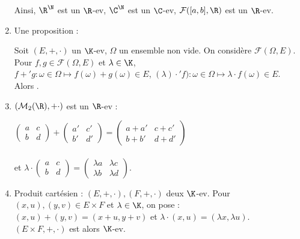 \documentclass[12pt, a4paper]{report}
\begin{document}
\begin{exemple}[Exemples]
\begin{enumerate}
	Ainsi, $\R^\N$ est un $\R$-ev, $\C^\N$ est un $\C$-ev, $\mathcal{F}([a,b], \R)$ est un $\R$-ev.
	
	\item Une proposition :
	
	\begin{proposition}{}{}
	
	Soit $(E,+,\cdot)$ un $\K$-ev, $\Omega$ un ensemble non vide. On considère $\mathcal{F}(\Omega,E)$. \\
	Pour $f,g \in \mathcal{F}(\Omega,E)$ et $\lambda \in \K$, \\
	$f +' g : \omega \in \Omega \mapsto f(\omega) + g(\omega) \in E$, $(\lambda) \cdot' f) : \omega \in \Omega \mapsto \lambda \cdot f(\omega) \in E$. \\
	Alors .
	
	\end{proposition}
	
	\item $(\mathcal{M}_2(\R), + \cdot)$ est un $\R$-ev :
	
	$\begin{pmatrix} a & c \\ b & d \end{pmatrix} + \begin{pmatrix} a' & c' \\ b' & d' \end{pmatrix} = \begin{pmatrix} a+a' & c+c' \\ b+b' & d+d' \end{pmatrix}$ \\ \\
	et $\lambda \cdot \begin{pmatrix} a & c \\ b & d \end{pmatrix} = \begin{pmatrix} \lambda a & \lambda c \\ \lambda b & \lambda d \end{pmatrix}$.
	
	\item Produit cartésien : $(E,+,\cdot), (F,+,\cdot)$ deux $\K$-ev. Pour $(x,u),(y,v) \in E \times F$ et $\lambda \in \K$, on pose : \\
	$(x,u)+(y,v) = (x+u,y+v)$ et $\lambda \cdot (x,u) = (\lambda x, \lambda u)$. \\
	$(E \times F, +, \cdot)$ est alors $\K$-ev.
	
	
\end{enumerate}

\end{exemple}
\end{document}
